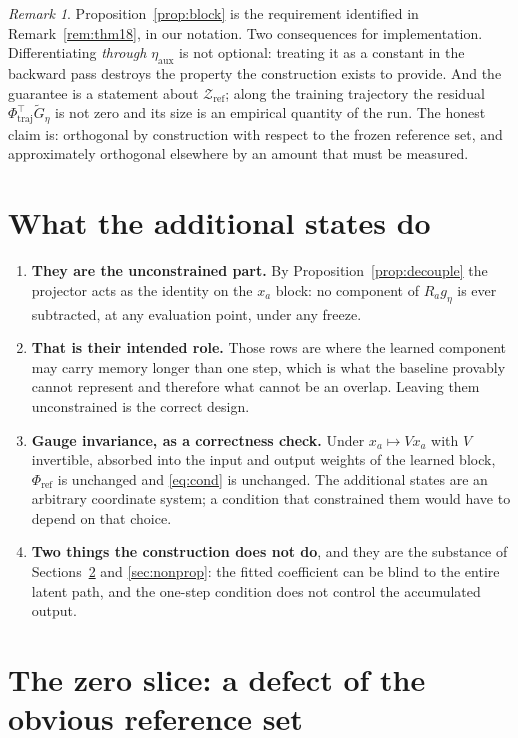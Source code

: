 \documentclass[11pt,a4paper]{article}
\theoremstyle{remark}
\newtheorem{remark}[proposition]{Remark}
\begin{document}
\begin{remark}
Proposition~\ref{prop:block} is the requirement identified in Remark~\ref{rem:thm18}, in our
notation. Two consequences for implementation. Differentiating \emph{through}
$\eta_{\mathrm{aux}}$ is not optional: treating it as a constant in the backward pass destroys the
property the construction exists to provide. And the guarantee is a statement about
$\mathcal Z_{\mathrm{ref}}$; along the training trajectory the residual
$\Phi_{\mathrm{traj}}^\top\widetilde G_\eta$ is not zero and its size is an empirical quantity of
the run. The honest claim is: orthogonal by construction with respect to the frozen reference set,
and approximately orthogonal elsewhere by an amount that must be measured.
\end{remark}

\section{What the additional states do}\label{sec:additional}

\begin{enumerate}
\item \textbf{They are the unconstrained part.} By Proposition~\ref{prop:decouple} the projector
acts as the identity on the $x_a$ block: no component of $R_ag_\eta$ is ever subtracted, at any
evaluation point, under any freeze.
\item \textbf{That is their intended role.} Those rows are where the learned component may carry
memory longer than one step, which is what the baseline provably cannot represent and therefore
what cannot be an overlap. Leaving them unconstrained is the correct design.
\item \textbf{Gauge invariance, as a correctness check.} Under $x_a\mapsto Vx_a$ with $V$
invertible, absorbed into the input and output weights of the learned block, $\Phi_{\mathrm{ref}}$
is unchanged and \eqref{eq:cond} is unchanged. The additional states are an arbitrary coordinate
system; a condition that constrained them would have to depend on that choice.
\item \textbf{Two things the construction does not do}, and they are the substance of
Sections~\ref{sec:zeroslice} and \ref{sec:nonprop}: the fitted coefficient can be blind to the
entire latent path, and the one-step condition does not control the accumulated output.
\end{enumerate}

\section{The zero slice: a defect of the obvious reference set}\label{sec:zeroslice}
\end{document}

